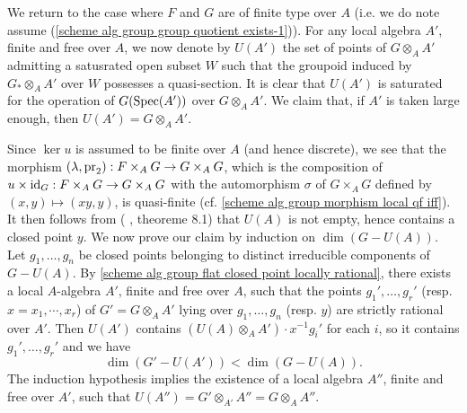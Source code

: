 We return to the case where $F$ and $G$ are of finite type over $A$ (i.e. we do note assume (\ref{scheme alg group group quotient exists-1})). For any local algebra $A'$, finite and free over $A$, we now denote by $U(A')$ the set of points of $G\otimes_AA'$ admitting a satusrated open subset $W$ such that the groupoid induced by $G_*\otimes_AA'$ over $W$ possesses a quasi-section. It is clear that $U(A')$ is saturated for the operation of $G(\mathrm{Spec}(A'))$ over $G\otimes_AA'$. We claim that, if $A'$ is taken large enough, then $U(A')=G\otimes_AA'$.\par
Since $\ker u$ is assumed to be finite over $A$ (and hence discrete), we see that the morphism $(\lambda,\mathrm{pr}_2):F\times_AG\to G\times_AG$, which is the composition of $u\times\operatorname{id}_G:F\times_AG\to G\times_AG$ with the automorphism $\sigma$ of $G\times_AG$ defined by $(x,y)\mapsto(xy,y)$, is quasi-finite (cf. \cref{scheme alg group morphism local qf iff}). It then follows from (\cite{SGA3-1} , theoreme 8.1) that $U(A)$ is not empty, hence contains a closed point $y$. We now prove our claim by induction on $\dim(G-U(A))$. Let $g_1,\dots,g_n$ be closed points belonging to distinct irreducible components of $G-U(A)$. By \cref{scheme alg group flat closed point locally rational}, there exists a local $A$-algebra $A'$, finite and free over $A$, such that the points $g_1',\dots,g_r'$ (resp. $x=x_1,\cdots, x_r$) of $G'=G\otimes_AA'$ lying over $g_1,\dots,g_n$ (resp. $y$) are strictly rational over $A'$. Then $U(A')$ contains $(U(A)\otimes_AA')\cdot x^{-1}g_i'$ for each $i$, so it contains $g_1',\dots,g_r'$ and we have
\[\dim(G'-U(A'))<\dim(G-U(A)).\]
The induction hypothesis implies the existence of a local algebra $A''$, finite and free over $A'$, such that $U(A'')=G'\otimes_{A'}A''=G\otimes_AA''$.\par

